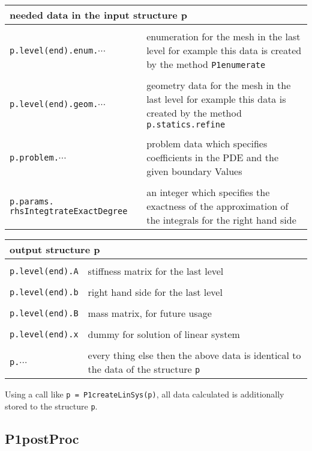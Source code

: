 \begin{longtable}[h]{p{5.5cm}p{6cm}}
\multicolumn{2}{l}{needed data in the input structure p}\\\hline\\[-1ex]

\verb+p.level(end).enum.+$\cdots$ & enumeration for the mesh in the last level for example  this data is created by the method \verb+P1enumerate+\\
\\
\verb+p.level(end).geom.+$\cdots$ & geometry data for the mesh in the last level for example this data is created by the method \verb+p.statics.refine+\\
\\
\verb+p.problem.+$\cdots$ & problem data which specifies coefficients in the PDE and the given boundary Values\\
\\
\verb+p.params.+ \verb+rhsIntegtrateExactDegree+ & an integer which specifies the exactness of the approximation of the integrals for the right hand side
\end{longtable}

\begin{longtable}[h]{p{5.5cm}p{6cm}}
\multicolumn{2}{l}{output structure p}\\\hline\\[-1ex]

\verb+p.level(end).A+ & stiffness matrix for the last level\\
\\
\verb+p.level(end).b+ & right hand side for the last level\\
\\
\verb+p.level(end).B+ & mass matrix, for future usage\\
\\
\verb+p.level(end).x+ & dummy for solution of linear system\\
\\
\verb+p.+$\cdots$ & every thing else then the above data is identical to the data of the structure \verb+p+
\end{longtable}

\noindent Using a call like \verb+p = P1createLinSys(p)+, all data calculated is additionally stored to the structure \verb+p+.


\subsection{P1postProc}
\\

